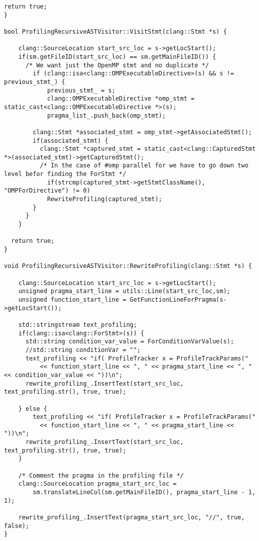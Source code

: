 \documentclass[a4paper,11pt,twoside]{book}
\begin{document}
\begin{lstlisting}[language=CCC, caption=driver/program.cpp]
  return true; 
}

bool ProfilingRecursiveASTVisitor::VisitStmt(clang::Stmt *s) {

	clang::SourceLocation start_src_loc = s->getLocStart();
	if(sm.getFileID(start_src_loc) == sm.getMainFileID()) {
      /* We want just the OpenMP stmt and no duplicate */
  		if (clang::isa<clang::OMPExecutableDirective>(s) && s != previous_stmt_) {
  			previous_stmt_ = s;
  			clang::OMPExecutableDirective *omp_stmt = static_cast<clang::OMPExecutableDirective *>(s);
  			pragma_list_.push_back(omp_stmt);
  			
        clang::Stmt *associated_stmt = omp_stmt->getAssociatedStmt();
        if(associated_stmt) {
          clang::Stmt *captured_stmt = static_cast<clang::CapturedStmt *>(associated_stmt)->getCapturedStmt();
          /* In the case of #omp parallel for we have to go down two level befor finding the ForStmt */
  		    if(strcmp(captured_stmt->getStmtClassName(), "OMPForDirective") != 0)
            RewriteProfiling(captured_stmt);
        }
      }
  	}
  	
  return true;
}

void ProfilingRecursiveASTVisitor::RewriteProfiling(clang::Stmt *s) {
  	
  	clang::SourceLocation start_src_loc = s->getLocStart();
  	unsigned pragma_start_line = utils::Line(start_src_loc,sm);
  	unsigned function_start_line = GetFunctionLineForPragma(s->getLocStart());

    std::stringstream text_profiling;
    if(clang::isa<clang::ForStmt>(s)) {
      std::string condition_var_value = ForConditionVarValue(s);
      //std::string conditionVar = "";
      text_profiling << "if( ProfileTracker x = ProfileTrackParams(" 
          << function_start_line << ", " << pragma_start_line << ", " << condition_var_value << "))\n";
      rewrite_profiling_.InsertText(start_src_loc, text_profiling.str(), true, true);

    } else {
	    text_profiling << "if( ProfileTracker x = ProfileTrackParams(" 
          << function_start_line << ", " << pragma_start_line << "))\n";
      rewrite_profiling_.InsertText(start_src_loc, text_profiling.str(), true, true);
    }

    /* Comment the pragma in the profiling file */
    clang::SourceLocation pragma_start_src_loc = 
        sm.translateLineCol(sm.getMainFileID(), pragma_start_line - 1, 1);
    
    rewrite_profiling_.InsertText(pragma_start_src_loc, "//", true, false);
}


\end{lstlisting}
\end{document}

